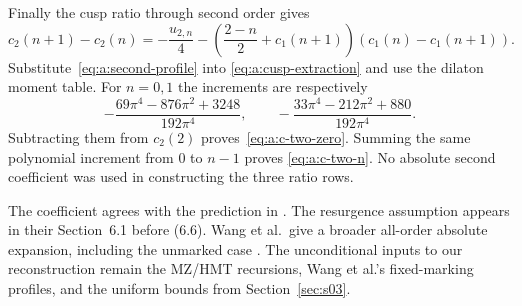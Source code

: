 \begin{prf}
Finally the cusp ratio through second order gives
\[
 c_2(n+1)-c_2(n)=-\frac{u_{2,n}}4
 -\left(\frac{2-n}{2}+c_1(n+1)\right)
                         (c_1(n)-c_1(n+1)).
\]
Substitute~\eqref{eq:a:second-profile} into
\eqref{eq:a:cusp-extraction} and use the dilaton moment table.
For $n=0,1$ the increments are respectively
\[
 -\frac{69\pi^4-876\pi^2+3248}{192\pi^4},\qquad
 -\frac{33\pi^4-212\pi^2+880}{192\pi^4}.
\]
Subtracting them from $c_2(2)$ proves~\eqref{eq:a:c-two-zero}.
Summing the same polynomial increment from $0$ to $n-1$ proves
\eqref{eq:a:c-two-n}. No absolute second coefficient was used in
constructing the three ratio rows.
\end{prf}

\begin{rmk}
The coefficient agrees with the prediction in \cite[(6.10)]{EGGLS24}.
The resurgence assumption appears in their Section~6.1 before (6.6).
Wang et al.\ give a broader all-order absolute expansion, including
the unmarked case \cite[Theorem~1.1 and (11.6)--(11.7)]{W26v5}.
The unconditional inputs to our reconstruction remain the MZ/HMT
recursions, Wang et al.'s fixed-marking profiles, and the uniform
bounds from Section~\ref{sec:s03}.
\end{rmk}
